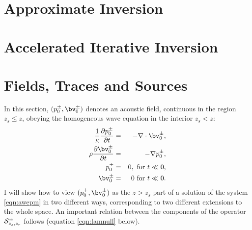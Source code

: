 \section{Approximate Inversion}


\section{Accelerated Iterative Inversion}

\section{Fields, Traces and Sources}
In this section, $(p^{\pm}_0,\bv^{\pm}_0)$ denotes an acoustic field,
continuous in the region $z_s \le z $, obeying the homogeneous wave
equation in the interior $z_s < z $:
\begin{eqnarray}
\label{eqn:awe1}
  \frac{1}{\kappa}\frac{\partial p^{\pm}_0}{\partial t} & = & - \nabla \cdot \bv^{\pm}_0, \nonumber \\
  \rho\frac{\partial \bv^{\pm}_0}{\partial t} & = & - \nabla
                                                    p^{\pm}_0, \nonumber \\
  p^{\pm}_0 & =& 0,  \mbox{ for } t \ll 0, \nonumber\\ 
  \bv^{\pm}_0 & = & 0 \mbox{ for } t \ll 0.
\end{eqnarray}
I will show how to view $(p^{\pm}_0,\bv^{\pm}_0)$ as the $z>z_s$ part
of a solution of the system \ref{eqn:awepm} in two different ways,
corresponding to two different extensions to the whole space. An
important relation between the components of the operator
${\cal S}^{\pm}_{z_s,z_r}$ follows (equation \ref{eqn:lamnull} below).

